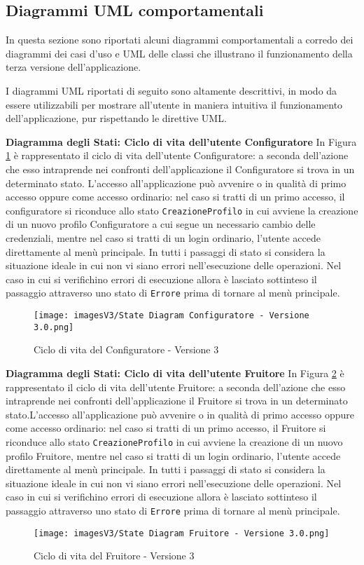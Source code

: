 \newpage
\subsection{Diagrammi UML comportamentali}
In questa sezione sono riportati alcuni diagrammi comportamentali a corredo dei diagrammi dei casi d'uso e UML delle classi che illustrano il funzionamento della terza versione dell'applicazione.

I diagrammi UML riportati di seguito sono altamente descrittivi, in modo da essere utilizzabili per mostrare all'utente in maniera intuitiva il funzionamento dell'applicazione, pur rispettando le direttive UML.\bigskip

\textbf{Diagramma degli Stati: Ciclo di vita dell'utente Configuratore}\newline
In Figura \ref{fig:State diagram 3.1} è rappresentato il ciclo di vita dell'utente Configuratore: a seconda dell'azione che esso intraprende nei confronti dell'applicazione il Configuratore si trova in un determinato stato.\newline 
L'accesso all'applicazione può avvenire o in qualità di primo accesso oppure come accesso ordinario: nel caso si tratti di un primo accesso, il configuratore si riconduce allo stato \texttt{CreazioneProfilo} in cui avviene la creazione di un nuovo profilo Configuratore a cui segue un necessario cambio delle credenziali, mentre nel caso si tratti di un login ordinario, l'utente accede direttamente al menù principale. \newline 
In tutti i passaggi di stato si considera la situazione ideale in cui non vi siano errori nell'esecuzione delle operazioni. Nel caso in cui si verifichino errori di esecuzione allora è lasciato sottinteso il passaggio attraverso uno stato di \texttt{Errore} prima di tornare al menù principale.

\begin{figure}[ht]
\centering
\texttt{[image: imagesV3/State Diagram Configuratore - Versione 3.0.png]}
\caption{\label{fig:State diagram 3.1}Ciclo di vita del Configuratore - Versione 3}
\end{figure}\bigskip

\textbf{Diagramma degli Stati: Ciclo di vita dell'utente Fruitore}\newline
In Figura \ref{fig:State diagram 3.2} è rappresentato il ciclo di vita dell'utente Fruitore: a seconda dell'azione che esso intraprende nei confronti dell'applicazione il Fruitore si trova in un determinato stato.\newline L'accesso all'applicazione può avvenire o in qualità di primo accesso oppure come accesso ordinario: nel caso si tratti di un primo accesso, il Fruitore si riconduce allo stato \texttt{CreazioneProfilo} in cui avviene la creazione di un nuovo profilo Fruitore, mentre nel caso si tratti di un login ordinario, l'utente accede direttamente al menù principale. \newline 
In tutti i passaggi di stato si considera la situazione ideale in cui non vi siano errori nell'esecuzione delle operazioni. Nel caso in cui si verifichino errori di esecuzione allora è lasciato sottinteso il passaggio attraverso uno stato di \texttt{Errore} prima di tornare al menù principale.

\begin{figure}[t!]
\centering
\texttt{[image: imagesV3/State Diagram Fruitore - Versione 3.0.png]}
\caption{\label{fig:State diagram 3.2}Ciclo di vita del Fruitore - Versione 3}
\end{figure}\bigskip